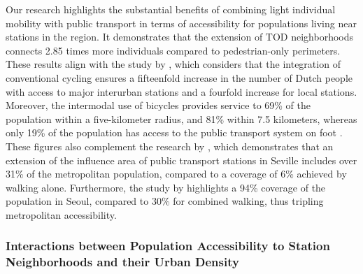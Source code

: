 \begin{refsegment}
Our research highlights the substantial benefits of combining light individual mobility with public transport in terms of accessibility for populations living near stations in the region. It demonstrates that the extension of \acrshort{TOD} neighborhoods connects 2.85 times more individuals compared to pedestrian-only perimeters. These results align with the study by \textcolor{blue}{\textcite[213]{kager_characterisation_2016}}, which considers that the integration of conventional cycling ensures a fifteenfold increase in the number of Dutch people with access to major interurban stations and a fourfold increase for local stations. Moreover, the intermodal use of bicycles provides service to 69\% of the population within a five-kilometer radius, and 81\% within 7.5 kilometers, whereas only 19\% of the population has access to the public transport system on foot \textcolor{blue}{\autocite[213]{kager_characterisation_2016}}. These figures also complement the research by \textcolor{blue}{\textcite[22]{marques_potential_2017}}, which demonstrates that an extension of the influence area of public transport stations in Seville includes over 31\% of the metropolitan population, compared to a coverage of 6\% achieved by walking alone. Furthermore, the study by \textcolor{blue}{\textcite[982]{lee_bicycle-based_2016}} highlights a 94\% coverage of the population in Seoul, compared to 30\% for combined walking, thus tripling metropolitan accessibility.%

\subsubsection*{Interactions between Population Accessibility to Station Neighborhoods and their Urban Density
    \label{chap5:analyse-bivariee-densite-accessibilite}
    }


\end{refsegment}
